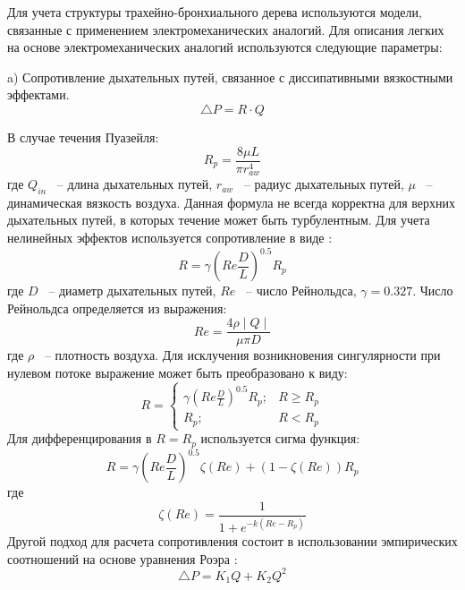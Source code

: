 Для учета структуры трахейно-бронхиального дерева используются модели, связанные с применением электромеханических аналогий. Для описания легких на основе электромеханических аналогий используются следующие параметры:

a) Сопротивление дыхательных путей, связанное с диссипативными вязкостными эффектами.
\begin{equation}
    \triangle P=R \cdot Q
\end{equation}

В случае течения Пуазейля:
\begin{equation}
R_{p}=\frac{8\mu L}{\pi r_{aw}^{4}}
\end{equation}
где $Q_{in}$ ~-- длина дыхательных путей, $r_{aw}$ ~-- радиус дыхательных путей, $\mu$ ~-- динамическая вязкость воздуха.
Данная формула не всегда корректна для верхних дыхательных путей, в которых течение может быть турбулентным. Для учета нелинейных эффектов используется сопротивление в виде \cite{Pedley1970}:
\begin{equation}
R=\gamma \left( Re \frac{D}{L}\right)^{0.5} R_{p}
\end{equation}
где $D$ ~-- диаметр дыхательных путей, $Re$ ~-- число Рейнольдса, $\gamma = 0.327$. Число Рейнольдса определяется из выражения:
\begin{equation}
Re=\frac{4\rho \mid Q\mid}{\mu \pi D}
\end{equation}
где $\rho$ ~-- плотность воздуха.
Для исклучения возникновения сингулярности при нулевом потоке выражение может быть преобразовано к виду:
\begin{equation}
R=
\begin{cases}
\gamma \left( Re \frac{D}{L}\right)^{0.5} R_{p}; & R \ge R_{p}\\
R_{p}; & R < R_{p}
\end{cases}
\end{equation}
Для дифференцирования в $R=R_{p}$ используется сигма функция:
\begin{equation}
R=\gamma \left( Re \frac{D}{L}\right)^{0.5}\zeta(Re)+\left(1-\zeta(Re)\right)R_{p} 
\end{equation}
где
\begin{equation}
\zeta(Re) = \frac{1}{1+e^{-k\left(Re-R_{p}\right)}}
\end{equation}
Другой подход для расчета сопротивления состоит в использовании эмпирических соотношений на основе уравнения Роэра \cite{Reynolds1979,Lambert1982,Ertbruggen2005}:
\begin{equation}
 \triangle P=K_{1}Q+K_{2}Q^{2}
\end{equation}

